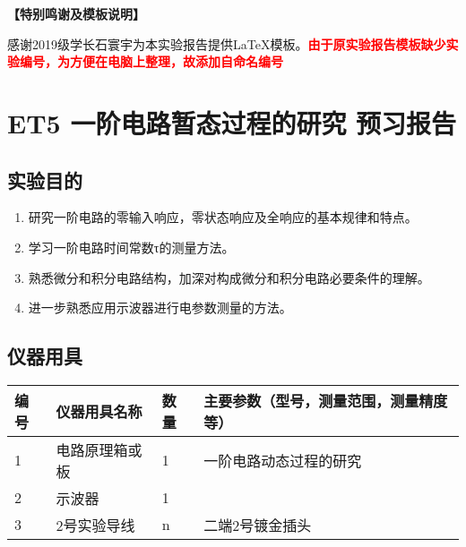 \documentclass[dvipsnames, svgnames,a4paper,11pt]{article}
\begin{document}
	\textbf{【特别鸣谢及模板说明】}	
	
	感谢2019级学长石寰宇为本实验报告提供\LaTeX 模板。\textcolor{red}{\textbf{由于原实验报告模板缺少实验编号，为方便在电脑上整理，故添加自命名编号}}
	
	
	
	\clearpage
	\tableofcontents
	\clearpage
	
	
	
	
	\setcounter{section}{0}
	\section{ET5 一阶电路暂态过程的研究 \quad\heiti 预习报告}
	
	\subsection{实验目的}
	\begin{enumerate}
		\item 研究一阶电路的零输入响应，零状态响应及全响应的基本规律和特点。
		\item 学习一阶电路时间常数τ的测量方法。
		\item 熟悉微分和积分电路结构，加深对构成微分和积分电路必要条件的理解。
		\item 进一步熟悉应用示波器进行电参数测量的方法。
		
	\end{enumerate}
	
	\subsection{仪器用具}
	\begin{table}[htbp]
		\centering
		\renewcommand\arraystretch{1.6}
		\begin{tabular}{p{}|p{}|p{}|p{}}
			\hline
			编号& 仪器用具名称 & 数量 &  主要参数（型号，测量范围，测量精度等） \\
			\hline
			1& 电路原理箱或板 & 1 & 一阶电路动态过程的研究 \\
			\hline
			2& 示波器 & 1 &  \\
			\hline
			3& 2号实验导线 & n & 二端2号镀金插头  \\
			\hline

		\end{tabular}
	\end{table}
	
\end{document}
